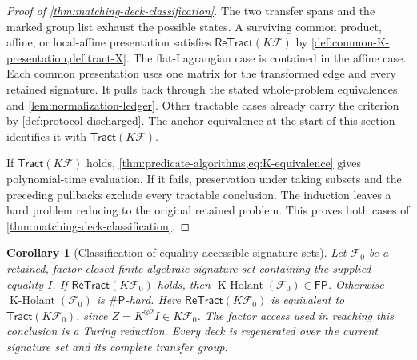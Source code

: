 \documentclass[11pt,letterpaper,onecolumn]{article}
\theoremstyle{plain}
\newtheorem{corollary}[corollary]{Corollary}
\theoremstyle{definition}
\theoremstyle{remark}
\newcommand{\cF}{\mathcal F}
\newcommand{\KHolant}{\operatorname{K\text{-}Holant}}
\newcommand{\Tract}{\mathsf{Tract}}
\newcommand{\ReTract}{\mathsf{ReTract}}
\newcommand{\FP}{\mathsf{FP}}
\newcommand{\SharpP}{\#\mathsf P}
\begin{document}
\begin{proof}[Proof of \cref{thm:matching-deck-classification}]
The two transfer spans and the marked group list exhaust the possible
states. A surviving common product, affine, or local-affine presentation
satisfies \(\ReTract(K\cF)\) by
\cref{def:common-K-presentation,def:tract-X}.
The flat-Lagrangian case is contained in the affine case.
Each common presentation uses one matrix for the transformed edge and
every retained signature. It pulls back through the stated whole-problem
equivalences and \cref{lem:normalization-ledger}.
Other tractable cases already carry the criterion by
\cref{def:protocol-discharged}. The anchor equivalence at the start of this
section identifies it with \(\Tract(K\cF)\).

If \(\Tract(K\cF)\) holds, \cref{thm:predicate-algorithms,eq:K-equivalence}
gives polynomial-time evaluation. If it fails, preservation under taking
subsets and the preceding pullbacks exclude every tractable conclusion.
The induction leaves a hard problem reducing to the original retained
problem. This proves both cases of \cref{thm:matching-deck-classification}.
\end{proof}

\begin{corollary}[Classification of equality-accessible signature sets]
\label{cor:equality-accessible-closure}
Let \(\cF_0\) be a retained, factor-closed finite algebraic
signature set containing the supplied equality \(I\).  If
\(\ReTract(K\cF_0)\) holds, then
\(\KHolant(\cF_0)\in\FP\). Otherwise
\(\KHolant(\cF_0)\) is \(\SharpP\)-hard.  Here
\(\ReTract(K\cF_0)\) is equivalent to \(\Tract(K\cF_0)\), since
\(Z=K^{\otimes2}I\in K\cF_0\).  The factor access used in reaching
this conclusion is a Turing reduction. Every deck is regenerated over the
current signature set and its complete transfer group.
\end{corollary}
\end{document}
